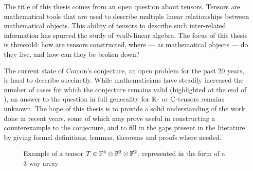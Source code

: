 \documentclass[../Lael_John_MasterThesis_Draft.tex]{subfiles}
\begin{document}
The title of this thesis comes from an open question about tensors. Tensors are mathematical tools that are used to describe multiple linear relationships between mathematical objects. This ability of tensors to describe such inter-related information has spurred the study of \textit{multi}-linear algebra. The focus of this thesis is threefold: how are tensors constructed, where --- as mathematical objects --- do they live, and how can they be broken down? 

The current state of Comon's conjecture, an open problem for the past 20 years, is hard to describe succinctly. While mathematicians have steadily increased the number of cases for which the conjecture remains valid (highlighted at the end of ), an answer to the question in full generality for $\mathbb{R}$- or $\mathbb{C}$-tensors remains unknown.  The hope of this thesis is to provide a solid understanding of the work done in recent years, some of which may prove useful in constructing a counterexample to the conjecture, and to fill in the gaps present in the literature by giving formal definitions, lemmas, theorems and proofs where needed.
\begin{figure}
    \centering
    \caption{Example of a tensor $T \in \mathbb{F}^4 \otimes \mathbb{F}^3 \otimes \mathbb{F}^2$, represented in the form of a $3$-way array}
\end{figure}
\end{document}
